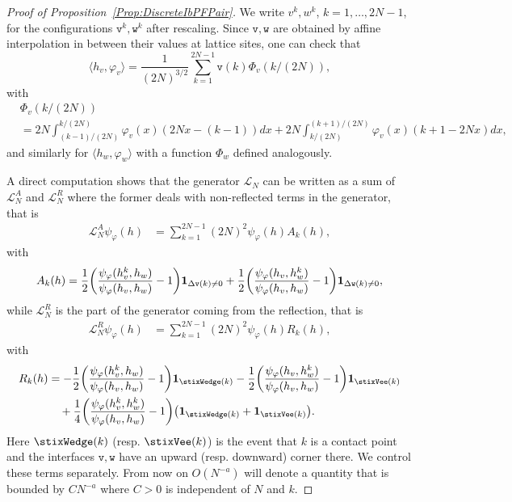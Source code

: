 \documentclass[AHL,Unicode,longabstracts]{cedram}
\newcommand{\Wedge}{\stixWedge}
\newcommand{\Vee}{\stixVee}
\theoremstyle{plain}
\newcommand{\tv}{\mathtt{v}}
\newcommand{\Tw}{\mathtt{w}}
\newcommand{\cL}{\mathcal{L}}
\let\originalleft\left
\let\originalright\right
\renewcommand{\left}{\mathopen{}\mathclose\bgroup\originalleft}
\renewcommand{\right}{\aftergroup\egroup\originalright}
\begin{document}
\begin{proof}[{Proof of Proposition~\ref{Prop:DiscreteIbPFPair}}]
We write $v^k,w^k$, $k=1,\dots,2N-1$, for the configurations $\tv^k,\Tw^k$ after rescaling. Since $\tv,\Tw$ are obtained by affine interpolation in between their values at lattice sites, one can check that
\[
\langle h_v,\varphi_v\rangle = \frac1{(2N)^{3/2}} \sum_{k=1}^{2N-1} \tv(k) \Phi_v(k/(2N)),
\]
with
\begin{align*}
&\Phi_v(k/(2N)) \\
&= 2N \int_{(k-1)/(2N)}^{k/(2N)} \varphi_v(x) (2Nx-(k-1)) dx + 2N \int_{k/(2N)}^{(k+1)/(2N)} \varphi_v(x) (k+1 - 2Nx) dx,
\end{align*}
and similarly for $\langle h_w,\varphi_w\rangle$ with a function $\Phi_w$ defined analogously.

A direct computation shows that the generator $\cL_N$ can be written as a sum of $ \cL_N^A$ and $ \cL_N^R$ where the former deals with non-reflected terms in the generator, that is
\begin{align*}
\cL_N^A \psi_\varphi(h) &= \sum_{k = 1}^{2N-1} {(2N)^2} \psi_\varphi(h)A_k(h),
\end{align*}
with
\[
A_k(h) = \frac12\left(\frac{\psi_\varphi(h_v^k,h_w)}{\psi_\varphi(h_v,h_w)} - 1 \right) \mathbf{1}_{\Delta \tv(k) \ne 0} + \frac12 \left(\frac{\psi_\varphi(h_v,h_w^k)}{\psi_\varphi(h_v,h_w)} - 1 \right) \mathbf{1}_{\Delta \Tw(k) \ne 0},
\]
while $ \cL_N^R$ is the part of the generator coming from the reflection, that is
\begin{align*}
\cL_N^R \psi_\varphi(h) &= \sum_{k = 1}^{2N-1} {(2N)^2}\psi_\varphi(h)R_k(h),
\end{align*}
with
\begin{align*}
R_k(h) &= -\frac12\left(\frac{\psi_\varphi(h_v^k,h_w)}{\psi_\varphi(h_v,h_w)} - 1 \right) \mathbf{1}_{\Wedge(k)}-\frac12\left(\frac{\psi_\varphi(h_v,h_w^k)}{\psi_\varphi(h_v,h_w)} - 1 \right) \mathbf{1}_{\Vee(k)} \\
&\quad + \frac14\left(\frac{\psi_\varphi(h_v^k,h_w^k)}{\psi_\varphi(h_v,h_w)} - 1 \right)\left(\mathbf{1}_{\Wedge(k)}+\mathbf{1}_{\Vee(k)}\right).
\end{align*}
Here $\Wedge(k)$ (resp. $\Vee(k)$) is the event that $k$ is a contact point and the interfaces $\tv, \Tw$ have an upward (resp. downward) corner there. We control these terms separately. From now on $O(N^{-a})$ will denote a quantity that is bounded by $CN^{-a}$ where $C>0$ is independent of $N$ and $k$.


\end{proof}
\end{document}
